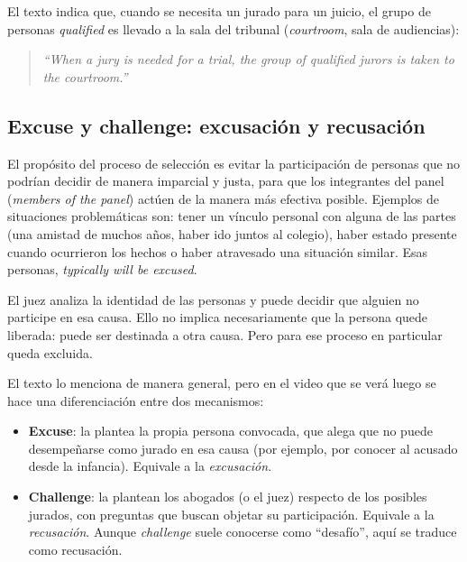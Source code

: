 \documentclass[12pt,oneside]{book}
\begin{document}
El texto indica que, cuando se necesita un jurado para un juicio, el grupo de personas \textit{qualified} es llevado a la sala del tribunal (\textit{courtroom}, sala de audiencias):

\begin{quote}
\textit{``When a jury is needed for a trial, the group of qualified jurors is taken to the courtroom.''}
\end{quote}

\subsection{Excuse y challenge: excusación y recusación}

El propósito del proceso de selección es evitar la participación de personas que no podrían decidir de manera imparcial y justa, para que los integrantes del panel (\textit{members of the panel}) actúen de la manera más efectiva posible. Ejemplos de situaciones problemáticas son: tener un vínculo personal con alguna de las partes (una amistad de muchos años, haber ido juntos al colegio), haber estado presente cuando ocurrieron los hechos o haber atravesado una situación similar. Esas personas, \textit{typically will be excused}.

El juez analiza la identidad de las personas y puede decidir que alguien no participe en esa causa. Ello no implica necesariamente que la persona quede liberada: puede ser destinada a otra causa. Pero para ese proceso en particular queda excluida.

El texto lo menciona de manera general, pero en el video que se verá luego se hace una diferenciación entre dos mecanismos:

\begin{itemize}
\item \textbf{Excuse}: la plantea la propia persona convocada, que alega que no puede desempeñarse como jurado en esa causa (por ejemplo, por conocer al acusado desde la infancia). Equivale a la \textit{excusación}.
\item \textbf{Challenge}: la plantean los abogados (o el juez) respecto de los posibles jurados, con preguntas que buscan objetar su participación. Equivale a la \textit{recusación}. Aunque \textit{challenge} suele conocerse como ``desafío'', aquí se traduce como recusación.
\end{itemize}
\end{document}
